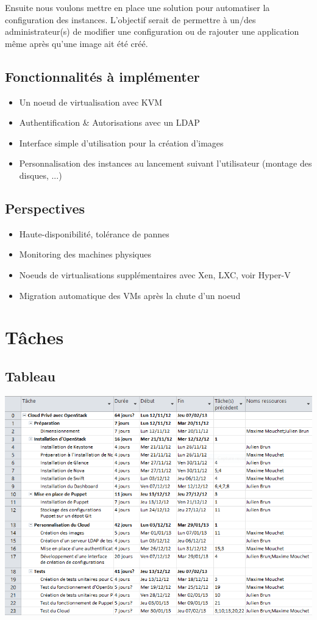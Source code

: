 \documentclass{report}
\begin{document}
Ensuite nous voulons mettre en place une solution pour automatiser la configuration des instances. L'objectif serait de permettre à un/des administrateur(s) de modifier une configuration ou de rajouter une application même après qu'une image ait été créé.

\section{Fonctionnalités à implémenter}
\begin{itemize}
\item Un noeud de virtualisation avec KVM
\item Authentification \& Autorisations avec un LDAP
\item Interface simple d'utilisation pour la création d'images
\item Personnalisation des instances au lancement suivant l'utilisateur (montage des disques, ...)
\end{itemize}

\section{Perspectives}
\begin{itemize}
\item Haute-disponibilité, tolérance de pannes
\item Monitoring des machines physiques
\item Noeuds de virtualisations supplémentaires avec Xen, LXC, voir Hyper-V
\item Migration automatique des VMs après la chute d'un noeud
\end{itemize}

\chapter{Tâches}
\section{Tableau}
\includegraphics[width=20cm,angle=90]{images/liste.png}
\end{document}

